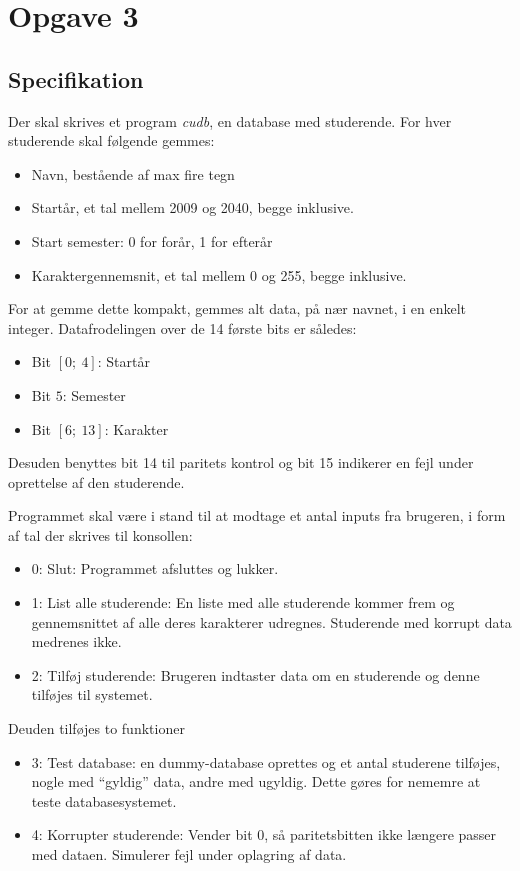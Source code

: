 \section{Opgave 3}
\subsection{Specifikation}
Der skal skrives et program \emph{cudb}, en database med studerende. For hver
studerende skal følgende gemmes:
\begin{itemize}
	\item Navn, bestående af max fire tegn
	\item Startår, et tal mellem 2009 og 2040, begge inklusive.
	\item Start semester: 0 for forår, 1 for efterår
	\item Karaktergennemsnit, et tal mellem 0 og 255, begge inklusive.
\end{itemize}

For at gemme dette kompakt, gemmes alt data, på nær navnet, i en enkelt integer.
Datafrodelingen over de 14 første bits er således:
\begin{itemize}
	\item Bit $[0;~4]$: Startår 
	\item Bit $5$: Semester
	\item Bit $[6;~13]$: Karakter
\end{itemize}

Desuden benyttes bit 14 til paritets kontrol og bit 15 indikerer en fejl under
oprettelse af den studerende.

Programmet skal være i stand til at modtage et antal inputs fra brugeren, i
form af tal der skrives til konsollen:
\begin{itemize}
	\item 0: Slut: Programmet afsluttes og lukker.
	\item 1: List alle studerende: En liste med alle studerende kommer frem og
	gennemsnittet af alle deres karakterer udregnes. Studerende med korrupt data
	medrenes ikke.
	\item 2: Tilføj studerende: Brugeren indtaster data om en studerende og denne
	tilføjes til systemet.
\end{itemize}
Deuden tilføjes to funktioner
\begin{itemize}
	\item 3: Test database: en dummy-database oprettes og et antal studerene
	tilføjes, nogle med ``gyldig'' data, andre med ugyldig. Dette gøres for nememre
	at teste databasesystemet.
	\item 4: Korrupter studerende: Vender bit 0, så paritetsbitten ikke længere
	passer med dataen. Simulerer fejl under oplagring af data.
\end{itemize}

